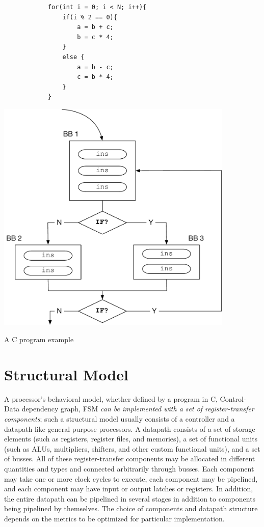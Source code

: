 \begin{listing}[!h]
    \begin{minipage}{0.5\textwidth}
        \begin{verbatim}
            for(int i = 0; i < N; i++){
                if(i % 2 == 0){
                    a = b + c;
                    b = c * 4;
                }
                else {
                    a = b - c;
                    c = b * 4;
                }
            }
        \end{verbatim}
    \end{minipage}
    \begin{minipage}{0.5\textwidth}
       \includegraphics[width=0.85\textwidth]{figures/Introduction/CFG.pdf}
    \end{minipage}
    \caption{A C program example}
    \label{fig:c_example}
\end{listing}


\section{Structural Model}

A processor’s behavioral model, whether defined by a program in C, Control-Data dependency graph, FSM \emph{can be implemented with a set of register-transfer components}; such a structural model usually consists of a controller and a datapath like general purpose processors.
A datapath consists of a set of storage elements (such as registers, register files, and memories), a set of functional units (such as ALUs, multipliers, shifters, and other custom functional units), and a set of busses.
All of these register-transfer components may be allocated in different quantities and types and connected arbitrarily through busses.
Each component may take one or more clock cycles to execute, each component may be pipelined, and each component may have input or output latches or registers.
In addition, the entire datapath can be pipelined in several stages in addition to components being pipelined by themselves.
The choice of components and datapath structure depends on the metrics to be optimized for particular implementation.

